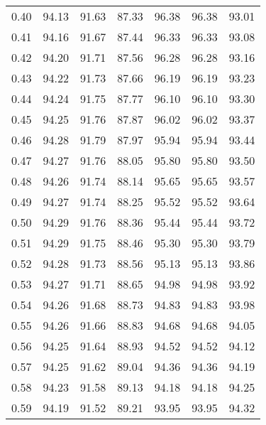 \begin{tabular}{|c|c|c|c|c|c|c|}
      0.40 &     94.13 &     91.63 &      87.33 &   96.38 &      96.38 &         93.01 \\
      0.41 &     94.16 &     91.67 &      87.44 &   96.33 &      96.33 &         93.08 \\
      0.42 &     94.20 &     91.71 &      87.56 &   96.28 &      96.28 &         93.16 \\
      0.43 &     94.22 &     91.73 &      87.66 &   96.19 &      96.19 &         93.23 \\
      0.44 &     94.24 &     91.75 &      87.77 &   96.10 &      96.10 &         93.30 \\
      0.45 &     94.25 &     91.76 &      87.87 &   96.02 &      96.02 &         93.37 \\
      0.46 &     94.28 &     91.79 &      87.97 &   95.94 &      95.94 &         93.44 \\
      0.47 &     94.27 &     91.76 &      88.05 &   95.80 &      95.80 &         93.50 \\
      0.48 &     94.26 &     91.74 &      88.14 &   95.65 &      95.65 &         93.57 \\
      0.49 &     94.27 &     91.74 &      88.25 &   95.52 &      95.52 &         93.64 \\
      0.50 &     94.29 &     91.76 &      88.36 &   95.44 &      95.44 &         93.72 \\
      0.51 &     94.29 &     91.75 &      88.46 &   95.30 &      95.30 &         93.79 \\
      0.52 &     94.28 &     91.73 &      88.56 &   95.13 &      95.13 &         93.86 \\
      0.53 &     94.27 &     91.71 &      88.65 &   94.98 &      94.98 &         93.92 \\
      0.54 &     94.26 &     91.68 &      88.73 &   94.83 &      94.83 &         93.98 \\
      0.55 &     94.26 &     91.66 &      88.83 &   94.68 &      94.68 &         94.05 \\
      0.56 &     94.25 &     91.64 &      88.93 &   94.52 &      94.52 &         94.12 \\
      0.57 &     94.25 &     91.62 &      89.04 &   94.36 &      94.36 &         94.19 \\
      0.58 &     94.23 &     91.58 &      89.13 &   94.18 &      94.18 &         94.25 \\
      0.59 &     94.19 &     91.52 &      89.21 &   93.95 &      93.95 &         94.32 \\

\end{tabular}
